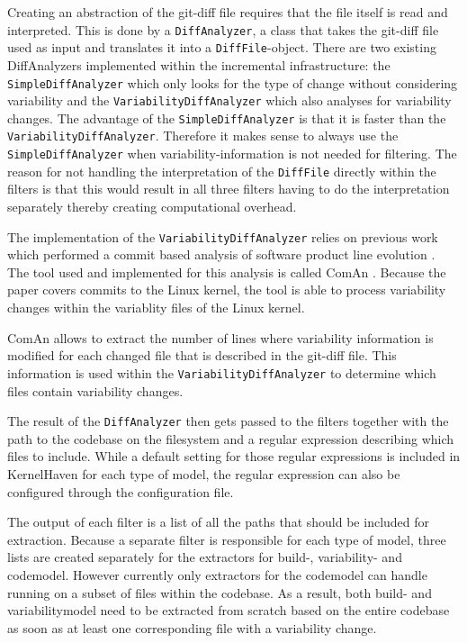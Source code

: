 \documentclass[a4paper]{article}
\begin{document}
Creating an abstraction of the git-diff file requires that the file itself is read and interpreted. This is done by a \texttt{DiffAnalyzer}, a class that takes the git-diff file used as input and translates it into a \texttt{DiffFile}-object. There are two existing DiffAnalyzers implemented within the incremental infrastructure: the \texttt{SimpleDiffAnalyzer} which only looks for the type of change without considering variability and the \texttt{VariabilityDiffAnalyzer} which also analyses for variability changes. The advantage of the \texttt{SimpleDiffAnalyzer} is that it is faster than the \texttt{VariabilityDiffAnalyzer}. 
Therefore it makes sense to always use the \texttt{SimpleDiffAnalyzer} when variability-information is not needed for filtering. The reason for not handling the interpretation of the \texttt{DiffFile} directly within the filters is that this would result in all three filters having to do the interpretation separately thereby creating computational overhead.

The implementation of the \texttt{VariabilityDiffAnalyzer} relies on previous work which performed a commit based analysis of software product line evolution \cite{ComAn}. The tool used and implemented for this analysis  is called ComAn \cite{ComAn-tool}. Because the paper covers commits to the Linux kernel, the tool is able to process variability changes within the variablity files of the Linux kernel. 

ComAn allows to extract the number of lines where variability information is modified for each changed file that is described in the git-diff file. This information is used within the \texttt{VariabilityDiffAnalyzer} to determine which files contain variability changes.

The result of the \texttt{DiffAnalyzer} then gets passed to the filters together with the path to the codebase on the filesystem and a regular expression describing which files to include. While a default setting for those regular expressions is included in KernelHaven for each type of model, the regular expression can also be configured through the configuration file. 

The output of each filter is a list of all the paths that should be included for extraction. Because a separate filter is responsible for each type of model, three lists are created separately for the extractors for build-, variability- and codemodel.
However currently only extractors for the codemodel can handle running on a subset of files within the codebase. As a result, both build- and variabilitymodel need to be extracted from scratch based on the entire codebase as soon as at least one corresponding file with a variability change.
\end{document}
